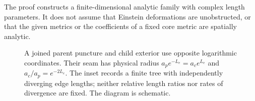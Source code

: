 The proof constructs a finite-dimensional analytic family with
complex length parameters.  It does not assume that Einstein
deformations are unobstructed, or that the given metrics or the
coefficients of a fixed core metric are spatially analytic.


\begin{figure}[htbp]
\centering

\caption{A joined parent puncture and child exterior use opposite logarithmic coordinates. Their seam has physical radius $a_p e^{-L_e}=a_c e^{L_e}$ and $a_c/a_p=e^{-2L_e}$. The inset records a finite tree with independently diverging edge lengths; neither relative length ratios nor rates of divergence are fixed. The diagram is schematic.}
\label{fig:tree-scales}
\end{figure}
\FloatBarrier
